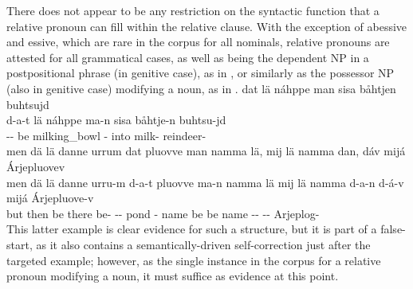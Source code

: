 There does not appear to be any restriction on the syntactic function that a relative pronoun can fill within the relative clause. With the exception of abessive and essive, which are rare in the corpus for all nominals, relative pronouns are attested for all grammatical cases, as well as being the dependent NP in a postpositional phrase (in genitive case), as in , or similarly as the possessor NP (also in genitive case) modifying a noun, as in . 
\ea\label{relClause7}%
\glll	dat lä náhppe man sisa båhtjen buhtsujd\\
	d-a-t lä náhppe ma-n sisa båhtje-n buhtsu-jd\\
	-- be\BS{} milking\_bowl\BS{} - into milk- reindeer-\\\nopagebreak
{} 
\z
\ea\label{relClause8}%
\glll	men dä lä danne urrum dat pluovve man namma lä, mij lä namma dan, dáv mijá Árjepluovev\\
	men dä lä danne urru-m d-a-t pluovve ma-n namma lä mij lä namma d-a-n d-á-v mijá Árjepluove-v\\
	but then be\BS{} there be- -- pond\BS{} - name\BS{} be\BS{} \BS{} be\BS{} name\BS{} -- --  Arjeplog-\\\nopagebreak
{} 
\z
This latter example is clear evidence for such a structure, but it is part of a false-start, as it also contains a semantically-driven self-correction just after the targeted example; however, as the single instance in the corpus for a relative pronoun modifying a noun, it must suffice as evidence at this point. %

